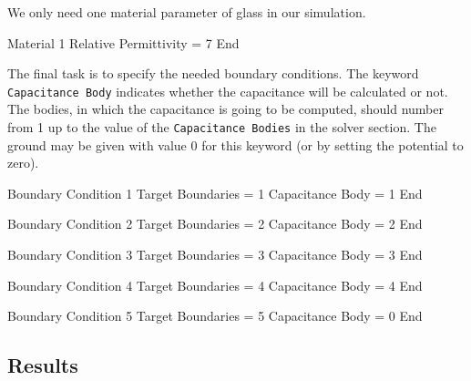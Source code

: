 \begin{flushleft}
We only need one material parameter of glass in our simulation.

\ttbegin               
Material 1
  Relative Permittivity = 7
End
\ttend

The final task is to specify the needed boundary conditions.
The keyword {\tt Capacitance Body} indicates whether the capacitance will be calculated or not.
The bodies, in which the capacitance is going to be computed, should number from 1 up to the value of the
{\tt Capacitance Bodies} in the solver section.
The ground may be given with value 0 for this keyword (or by setting the potential to zero).  

\ttbegin
Boundary Condition 1
  Target Boundaries = 1
  Capacitance Body = 1
End

Boundary Condition 2
  Target Boundaries = 2
  Capacitance Body = 2
End

Boundary Condition 3
  Target Boundaries = 3
  Capacitance Body = 3
End

Boundary Condition 4
  Target Boundaries = 4
  Capacitance Body = 4
End

Boundary Condition 5
  Target Boundaries = 5
  Capacitance Body = 0
End
\ttend

\end{flushleft}


\subsection*{Results}

